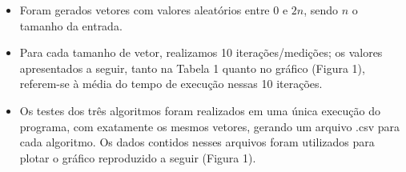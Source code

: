 \documentclass[fontsize=10pt]{article}
\begin{document}
\begin{itemize}
    \item Foram gerados vetores com valores aleatórios entre $0$ e $2n$, sendo $n$ o tamanho da entrada.
    
    \item Para cada tamanho de vetor, realizamos 10 iterações/medições; os valores apresentados a seguir, tanto na Tabela 1 quanto no gráfico (Figura 1), referem-se à média do tempo de execução nessas 10 iterações.
    
    \item Os testes dos três algoritmos foram realizados em uma única execução do programa, com exatamente os mesmos vetores, gerando um arquivo .csv para cada algoritmo. Os dados contidos nesses arquivos foram utilizados para plotar o gráfico reproduzido a seguir (Figura 1).
\end{itemize}
\end{document}
